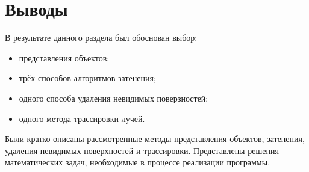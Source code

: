 \section*{Выводы}
В результате данного раздела был обоснован выбор:
\begin{itemize}
    \item представления объектов;
    \item трёх способов алгоритмов затенения;
    \item одного способа удаления невидимых поверзностей;
    \item одного метода трассировки лучей.
\end{itemize}

Были кратко описаны рассмотренные методы представления объектов,
затенения, удаления невидимых поверхностей и трассировки.
Представлены решения математических задач, необходимые в процессе
реализации программы.